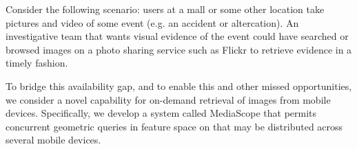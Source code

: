 \documentclass{sig-alt-release2}
\newcommand{\mscope}{MediaScope\xspace}
\begin{document}
%
Consider the following scenario: users at a mall or some other
location take pictures and video of some event (e.g. an accident or
altercation).
%
An investigative team that wants visual evidence of the event
could have searched or browsed images on
a photo sharing service such as Flickr
to retrieve evidence in a timely fashion.
%
%


To bridge this availability gap, and to enable this and other missed
opportunities,
 we consider a novel
capability for
 on-demand retrieval of images from mobile devices.
%
Specifically, we develop a system called \mscope that permits
concurrent
geometric queries in feature space on
that may be distributed across several mobile devices.
%
%

\end{document}
